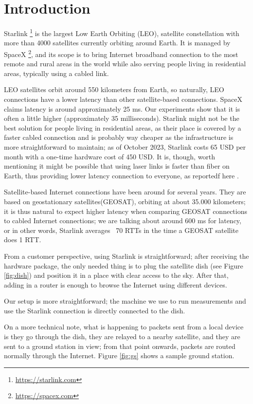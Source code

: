 \documentclass[IN,11pt,twoside,openright,idp,english]{tumthesis}
\begin{document}
\section{Introduction}
    
Starlink \footnote{\url{https://starlink.com}} is the largest Low Earth Orbiting (LEO), satellite constellation with more than 4000 satellites currently orbiting around Earth. It is managed by SpaceX \footnote{\url{https://spacex.com}}, and its scope is to bring Internet broadband connection to the most remote and rural areas in the world while also serving people living in residential areas, typically using a cabled link.
    
LEO satellites orbit around 550 kilometers from Earth, so naturally, LEO connections have a lower latency than other satellite-based connections. SpaceX claims latency is around approximately 25 ms. Our experiments show that it is often a little higher (approximately 35 milliseconds). 
Starlink might not be the best solution for people living in residential areas, as their place is covered by a faster cabled connection and is probably way cheaper as the infrastructure is more straightforward to maintain; as of October 2023, Starlink costs 65 USD per month with a one-time hardware cost of 450 USD. 
It is, though, worth mentioning it might be possible that using laser links is faster than fiber on Earth, thus providing lower latency connection to everyone, as reportedf here \cite{tweet}.

Satellite-based Internet connections have been around for several years. They are based on geostationary satellites(GEOSAT), orbiting at about 35.000 kilometers; it is thus natural to expect higher latency when comparing GEOSAT connections to cabled Internet connections; we are talking about around 600 ms for latency, or in other words, Starlink averages ~70 RTTs in the time a GEOSAT satellite does 1 RTT.
    
From a customer perspective, using Starlink is straightforward; after receiving the hardware package, the only needed thing is to plug the satellite dish (see Figure \ref{fig:dish}) and position it in a place with clear access to the sky. After that, adding in a router is enough to browse the Internet using different devices. 

Our setup is more straightforward; the machine we use to run measurements and use the Starlink connection is directly connected to the dish.
    
On a more technical note, what is happening to packets sent from a local device is they go through the dish, they are relayed to a nearby satellite, and they are sent to a ground station in view; from that point onwards, packets are routed normally through the Internet. Figure \ref{fig:gs} shows a sample ground station.
    
\end{document}

